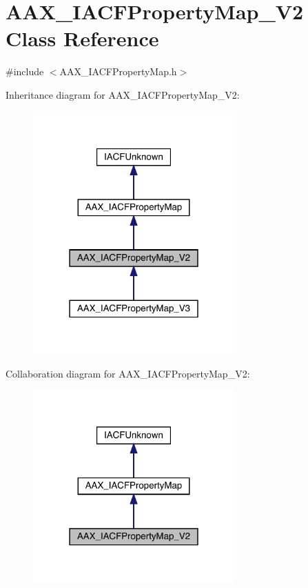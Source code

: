 \hypertarget{a01749}{}\section{A\+A\+X\+\_\+\+I\+A\+C\+F\+Property\+Map\+\_\+\+V2 Class Reference}
\label{a01749}


{\ttfamily \#include $<$A\+A\+X\+\_\+\+I\+A\+C\+F\+Property\+Map.\+h$>$}



Inheritance diagram for A\+A\+X\+\_\+\+I\+A\+C\+F\+Property\+Map\+\_\+\+V2\+:
\nopagebreak
\begin{figure}[H]
\begin{center}
\leavevmode
\includegraphics[width=219pt]{a01748}
\end{center}
\end{figure}


Collaboration diagram for A\+A\+X\+\_\+\+I\+A\+C\+F\+Property\+Map\+\_\+\+V2\+:
\nopagebreak
\begin{figure}[H]
\begin{center}
\leavevmode
\includegraphics[width=219pt]{a01747}
\end{center}
\end{figure}


